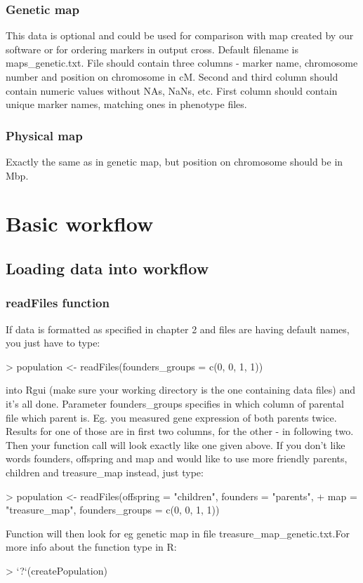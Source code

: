 \documentclass{article}
\begin{document}
\begin{multicols}{2}
\subsubsection{Genetic map}
This data is optional and could be used for comparison with map created by our software or for ordering markers in output cross. Default filename is maps\_genetic.txt. File should contain three columns - marker name, chromosome number and position on chromosome in cM. Second and third column should contain numeric values without NAs, NaNs, etc. First column should contain unique marker names, matching ones in phenotype files.
\subsubsection{Physical map}
Exactly the same as in genetic map, but position on chromosome should be in Mbp.
\end{multicols}
\newpage

\section{Basic workflow}
\subsection{Loading data into workflow}
\subsubsection{readFiles function}
If data is formatted as specified in chapter 2 and files are having default names, you just have to type: 
\begin{Schunk}
\begin{Sinput}
> population <- readFiles(founders_groups = c(0, 0, 1, 1))
\end{Sinput}
\end{Schunk}
 into Rgui (make sure your working directory is the one containing data files) and it's all done. Parameter founders\_groups specifies in which column of parental file which parent is. Eg. you measured gene expression of both parents twice. Results for one of those are in first two columns, for the other - in following two. Then your function call will look exactly like one given above. 
If you don't like words founders, offspring and map and would like to use more friendly parents, children and treasure\_map instead, just type:
\begin{Schunk}
\begin{Sinput}
> population <- readFiles(offspring = "children", founders = "parents", 
+     map = "treasure_map", founders_groups = c(0, 0, 1, 1))
\end{Sinput}
\end{Schunk}
{\noindent}Function will then look for eg genetic map in file treasure\_map\_genetic.txt.For more info about the function type in R:
\begin{Schunk}
\begin{Sinput}
> `?`(createPopulation)
\end{Sinput}
\end{Schunk}
\end{document}
